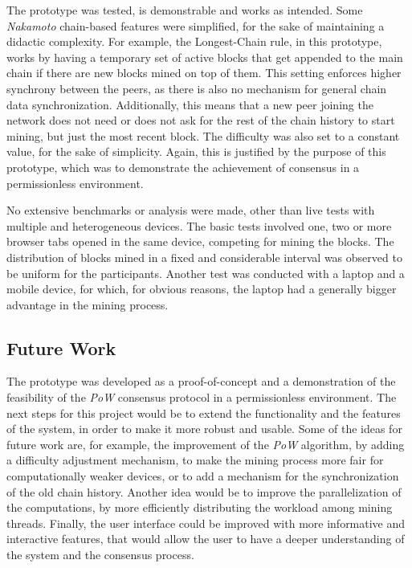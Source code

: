 \documentclass[journal]{IEEEtran}
\begin{document}
The prototype was tested, is demonstrable and works as intended. Some \emph{Nakamoto} chain-based
features were simplified, for the sake of maintaining a didactic complexity. For example, 
the Longest-Chain rule, in this prototype, works by having a temporary set of active blocks 
that get appended to the main chain if there are new blocks mined on top
of them. This setting enforces higher synchrony between the peers, as there is also no mechanism for
general chain data synchronization. Additionally, this means that a new peer joining the network does not
need or does not ask for the rest of the chain history to start mining, but just the most recent block.
The difficulty was also set to a constant value, for the sake of simplicity.
Again, this is justified by the purpose of this prototype, which was to demonstrate the achievement
of consensus in a permissionless environment.

No extensive benchmarks or analysis were made, other than live tests with multiple
and heterogeneous devices. The basic tests involved one, two or more browser tabs
opened in the same device, competing for mining the blocks. The distribution of blocks mined
in a fixed and considerable interval was observed to be uniform for the participants. Another test was
conducted with a laptop and a mobile device, for which, for obvious reasons, the laptop
had a generally bigger advantage in the mining process.

\subsection{Future Work}

The prototype was developed as a proof-of-concept and a demonstration of the feasibility
of the \emph{PoW} consensus protocol in a permissionless environment. The next steps
for this project would be to extend the functionality and the features of the system,
in order to make it more robust and usable. Some of the ideas for future work are, for example,
the improvement of the \emph{PoW} algorithm, by adding a difficulty adjustment mechanism,
to make the mining process more fair for computationally weaker devices, or to
add a mechanism for the synchronization of the old chain history. Another idea would be to
improve the parallelization of the computations, by more efficiently distributing the
workload among mining threads. Finally, the user interface could be improved 
with more informative and interactive features, that would allow the user to have a 
deeper understanding of the system and the consensus process.

\end{document}
